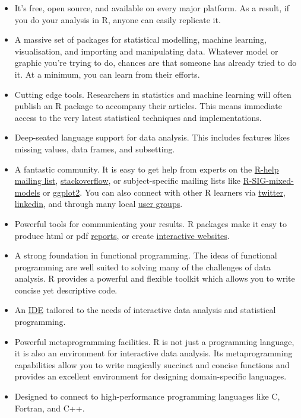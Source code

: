 \begin{itemize}
\item
  It's free, open source, and available on every major platform. As a
  result, if you do your analysis in R, anyone can easily replicate it.
\item
  A massive set of packages for statistical modelling, machine learning,
  visualisation, and importing and manipulating data. Whatever model or
  graphic you're trying to do, chances are that someone has already
  tried to do it. At a minimum, you can learn from their efforts.
\item
  Cutting edge tools. Researchers in statistics and machine learning
  will often publish an R package to accompany their articles. This
  means immediate access to the very latest statistical techniques and
  implementations.
\item
  Deep-seated language support for data analysis. This includes features
  likes missing values, data frames, and subsetting.
\item
  A fantastic community. It is easy to get help from experts on the
  \href{https://stat.ethz.ch/mailman/listinfo/r-help}{R-help mailing
  list},
  \href{http://stackoverflow.com/questions/tagged/r}{stackoverflow}, or
  subject-specific mailing lists like
  \href{https://stat.ethz.ch/mailman/listinfo/r-sig-mixed-models}{R-SIG-mixed-models}
  or \href{https://groups.google.com/forum/\#!forum/ggplot2}{ggplot2}.
  You can also connect with other R learners via
  \href{https://twitter.com/search?q=\%23rstats}{twitter},
  \href{http://www.linkedin.com/groups/R-Project-Statistical-Computing-77616}{linkedin},
  and through many local
  \href{http://blog.revolutionanalytics.com/local-r-groups.html}{user
  groups}.
\item
  Powerful tools for communicating your results. R packages make it easy
  to produce html or pdf \href{http://yihui.name/knitr/}{reports}, or
  create \href{http://www.rstudio.com/shiny/}{interactive websites}.
\item
  A strong foundation in functional programming. The ideas of functional
  programming are well suited to solving many of the challenges of data
  analysis. R provides a powerful and flexible toolkit which allows you
  to write concise yet descriptive code.
\item
  An \href{http://www.rstudio.com/ide/}{IDE} tailored to the needs of
  interactive data analysis and statistical programming.
\item
  Powerful metaprogramming facilities. R is not just a programming
  language, it is also an environment for interactive data analysis. Its
  metaprogramming capabilities allow you to write magically succinct and
  concise functions and provides an excellent environment for designing
  domain-specific languages.
\item
  Designed to connect to high-performance programming languages like C,
  Fortran, and C++.
\end{itemize}

